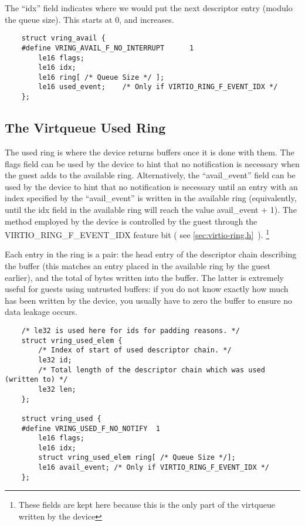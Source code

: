 The “idx” field indicates where we would put the next descriptor
entry (modulo the queue size). This starts at 0, and increases.

\begin{lstlisting}
	struct vring_avail {
	#define VRING_AVAIL_F_NO_INTERRUPT      1
		le16 flags;
		le16 idx;
		le16 ring[ /* Queue Size */ ];
		le16 used_event;	/* Only if VIRTIO_RING_F_EVENT_IDX */
	};
\end{lstlisting}

\subsection{The Virtqueue Used Ring}\label{sec:Basic Facilities of a Virtio Device / Virtqueues / The Virtqueue Used Ring}

The used ring is where the device returns buffers once it is done
with them. The flags field can be used by the device to hint that
no notification is necessary when the guest adds to the available
ring. Alternatively, the “avail_event” field can be used by the
device to hint that no notification is necessary until an entry
with an index specified by the “avail_event” is written in the
available ring (equivalently, until the idx field in the
available ring will reach the value avail_event + 1). The method
employed by the device is controlled by the guest through the
VIRTIO_RING_F_EVENT_IDX feature bit (
see \ref{sec:virtio-ring.h}~).
\footnote{These fields are kept here because this is the only part of the
virtqueue written by the device
}

Each entry in the ring is a pair: the head entry of the
descriptor chain describing the buffer (this matches an entry
placed in the available ring by the guest earlier), and the total
of bytes written into the buffer. The latter is extremely useful
for guests using untrusted buffers: if you do not know exactly
how much has been written by the device, you usually have to zero
the buffer to ensure no data leakage occurs.

\begin{lstlisting}
	/* le32 is used here for ids for padding reasons. */
	struct vring_used_elem {
		/* Index of start of used descriptor chain. */
		le32 id;
		/* Total length of the descriptor chain which was used (written to) */
		le32 len;
	};

	struct vring_used {
	#define VRING_USED_F_NO_NOTIFY  1
		le16 flags;
		le16 idx;
		struct vring_used_elem ring[ /* Queue Size */];
		le16 avail_event; /* Only if VIRTIO_RING_F_EVENT_IDX */
	};
\end{lstlisting}

